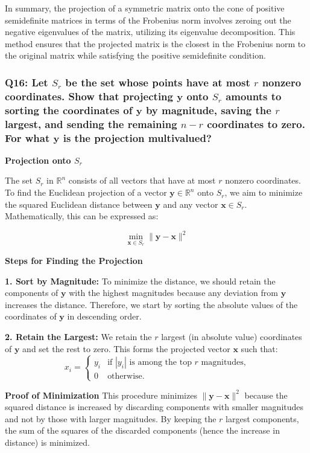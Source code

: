 \documentclass[8pt]{article}
\begin{document}
{In summary, the projection of a symmetric matrix onto the cone of positive semidefinite matrices in terms of the Frobenius norm involves zeroing out the negative eigenvalues of the matrix, utilizing its eigenvalue decomposition. This method ensures that the projected matrix is the closest in the Frobenius norm to the original matrix while satisfying the positive semidefinite condition.

\subsubsection*{Q16: Let \(S_r\) be the set whose points have at most \(r\) nonzero coordinates. Show that projecting \(\mathbf{y}\) onto \(S_r\) amounts to sorting the coordinates of \(\mathbf{y}\) by magnitude, saving the \(r\) largest, and sending the remaining \(n - r\) coordinates to zero. For what \(\mathbf{y}\) is the projection multivalued?}

\textbf{Projection onto \(S_r\)}

The set \(S_r\) in \(\mathbb{R}^n\) consists of all vectors that have at most \(r\) nonzero coordinates. To find the Euclidean projection of a vector \(\mathbf{y} \in \mathbb{R}^n\) onto \(S_r\), we aim to minimize the squared Euclidean distance between \(\mathbf{y}\) and any vector \(\mathbf{x} \in S_r\). Mathematically, this can be expressed as:

\[
\min_{\mathbf{x} \in S_r} \|\mathbf{y} - \mathbf{x}\|^2
\]

\textbf{Steps for Finding the Projection}

\textbf{1. Sort by Magnitude:}
   To minimize the distance, we should retain the components of \(\mathbf{y}\) with the highest magnitudes because any deviation from \(\mathbf{y}\) increases the distance. Therefore, we start by sorting the absolute values of the coordinates of \(\mathbf{y}\) in descending order.

\textbf{2. Retain the Largest:}
   We retain the \(r\) largest (in absolute value) coordinates of \(\mathbf{y}\) and set the rest to zero. This forms the projected vector \(\mathbf{x}\) such that:
   \[
   x_i = 
   \begin{cases} 
   y_i & \text{if } |y_i| \text{ is among the top } r \text{ magnitudes,} \\
   0 & \text{otherwise.}
   \end{cases}
   \]

\textbf{Proof of Minimization}
This procedure minimizes \(\|\mathbf{y} - \mathbf{x}\|^2\) because the squared distance is increased by discarding components with smaller magnitudes and not by those with larger magnitudes. By keeping the \(r\) largest components, the sum of the squares of the discarded components (hence the increase in distance) is minimized.

}
\end{document}
